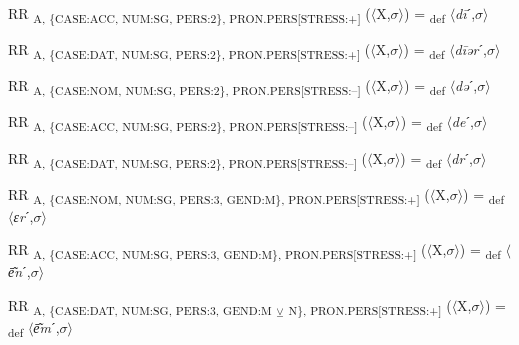 {\begin{exe}
 RR \textsubscript{A, \{CASE:ACC, NUM:SG, PERS:2\}, PRON.PERS[STRESS:+]} ($\langle$X,$\sigma $$\rangle$) = \textsubscript{def} $\langle$\textit{d\=i}ˊ,$\sigma $$\rangle$
\end{exe}

\begin{exe}
 RR \textsubscript{A, \{CASE:DAT, NUM:SG, PERS:2\}, PRON.PERS[STRESS:+]} ($\langle$X,$\sigma $$\rangle$) = \textsubscript{def} $\langle$\textit{d\=iər}ˊ,$\sigma $$\rangle$
\end{exe}

\begin{exe}
 RR \textsubscript{A, \{CASE:NOM, NUM:SG, PERS:2\}, PRON.PERS[STRESS:–]} ($\langle$X,$\sigma $$\rangle$) = \textsubscript{def} $\langle$\textit{də}ˊ,$\sigma $$\rangle$
\end{exe}

\begin{exe}
 RR \textsubscript{A, \{CASE:ACC, NUM:SG, PERS:2\}, PRON.PERS[STRESS:–]} ($\langle$X,$\sigma $$\rangle$) = \textsubscript{def} $\langle$\textit{de}ˊ,$\sigma $$\rangle$
\end{exe}

\begin{exe}
 RR \textsubscript{A, \{CASE:DAT, NUM:SG, PERS:2\}, PRON.PERS[STRESS:–]} ($\langle$X,$\sigma $$\rangle$) = \textsubscript{def} $\langle$\textit{dr}ˊ,$\sigma $$\rangle$
\end{exe}

\begin{exe}
 RR \textsubscript{A, \{CASE:NOM, NUM:SG, PERS:3, GEND:M\}, PRON.PERS[STRESS:+]} ($\langle$X,$\sigma $$\rangle$) = \textsubscript{def} $\langle$\textit{ɛr}ˊ,$\sigma $$\rangle$
\end{exe}

\begin{exe}
 RR \textsubscript{A, \{CASE:ACC, NUM:SG, PERS:3, GEND:M\}, PRON.PERS[STRESS:+]} ($\langle$X,$\sigma $$\rangle$) = \textsubscript{def} $\langle$\textit{\=e͂n}ˊ,$\sigma $$\rangle$
\end{exe}

\begin{exe}
 RR \textsubscript{A, \{CASE:DAT, NUM:SG, PERS:3, GEND:M} \textsubscript{${\veebar}$}\textsubscript{ N\}, PRON.PERS[STRESS:+]} ($\langle$X,$\sigma $$\rangle$) = \textsubscript{def} $\langle$\textit{\=e͂m}ˊ,$\sigma $$\rangle$
\end{exe}

}
